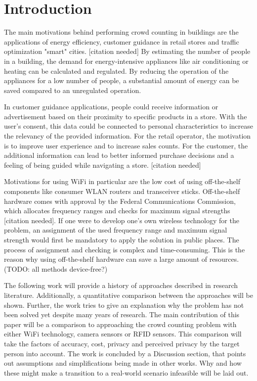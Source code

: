 \documentclass[conference]{IEEEtran}
\begin{document}
\section{Introduction}
The main motivations behind performing crowd counting in buildings are the applications of energy efficiency, customer guidance in retail stores and traffic optimization "smart" cities. [citation needed] By estimating the number of people in a building, the demand for energy-intensive appliances like air conditioning or heating can be calculated and regulated. By reducing the operation of the appliances for a low number of people, a substantial amount of energy can be saved compared to an unregulated operation. 
\par
In customer guidance applications, people could receive information or advertisement based on their proximity to specific products in a store. With the user's consent, this data could be connected to personal characteristics to increase the relevancy of the provided information. For the retail operator, the motivation is to improve user experience and to increase sales counts. For the customer, the additional information can lead to better informed purchase decisions and a feeling of being guided while navigating a store. [citation needed]
\par
Motivations for using WiFi in particular are the low cost of using off-the-shelf components like consumer WLAN routers and transceiver sticks. Off-the-shelf hardware comes with approval by the Federal Communications Commission, which allocates frequency ranges and checks for maximum signal strengths [citation needed]. If one were to develop one's own wireless technology for the problem, an assignment of the used frequency range and maximum signal strength would first be mandatory to apply the solution in public places. The process of assignment and checking is complex and time-consuming. This is the reason why using off-the-shelf hardware can save a large amount of resources. (TODO: all methods device-free?)
\par
The following work will provide a history of approaches described in research literature. Additionally, a quantitative comparison between the approaches will be shown. Further, the work tries to give an explanation why the problem has not been solved yet despite many years of research. The main contribution of this paper will be a comparison to approaching the crowd counting problem with either WiFi technology, camera sensors or RFID sensors. This comparison will take the factors of accuracy, cost, privacy and perceived privacy by the target person into account. The work is concluded by a Discussion section, that points out assumptions and simplifications being made in other works. Why and how these might make a transition to a real-world scenario infeasible will be laid out.
\end{document}

